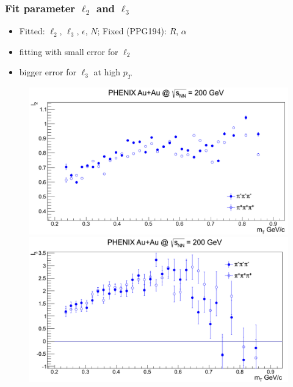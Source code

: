 \documentclass{beamer}
\begin{document}
\begin{frame}
\frametitle{Fit parameter $\ell_2$ and $\ell_3$}
\begin{itemize}
\setlength{\itemsep}{10pt}
\item Fitted: $\ell_2$, $\ell_3$, $\epsilon$, $N$; Fixed (PPG194): $R$, $\alpha$
\item fitting with small error for $\ell_2$
\item bigger error for $\ell_3$ at high $p_T$
\end{itemize}
\begin{figure}
\includegraphics[scale=0.2]{pic/l2}
\includegraphics[scale=0.2]{pic/l3}
\end{figure}
\end{frame}
\end{document}
